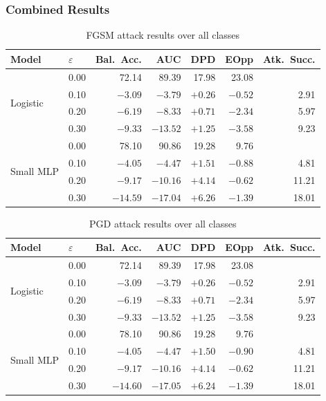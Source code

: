 \documentclass[11pt]{article}
\begin{document}
\subsubsection*{Combined Results}

\begin{table}[H]
\centering
\caption{FGSM attack results over all classes}
\label{tab:fgsm}
\begin{tabular}{llrrrrr}
\toprule
Model & $\varepsilon$ & Bal.\ Acc. & AUC & DPD & EOpp & Atk.\ Succ. \\
\midrule
\multirow{4}{*}{Logistic}
 & 0.00 & 72.14 & 89.39 & 17.98 & 23.08 & \\
 & 0.10 & $-3.09$ & $-3.79$ & $+0.26$ & $-0.52$ & 2.91 \\
 & 0.20 & $-6.19$ & $-8.33$ & $+0.71$ & $-2.34$ & 5.97 \\
 & 0.30 & $-9.33$ & $-13.52$ & $+1.25$ & $-3.58$ & 9.23 \\
\midrule
\multirow{4}{*}{Small MLP}
 & 0.00 & 78.10 & 90.86 & 19.28 & 9.76 & \\
 & 0.10 & $-4.05$ & $-4.47$ & $+1.51$ & $-0.88$ & 4.81 \\
 & 0.20 & $-9.17$ & $-10.16$ & $+4.14$ & $-0.62$ & 11.21 \\
 & 0.30 & $-14.59$ & $-17.04$ & $+6.26$ & $-1.39$ & 18.01 \\
\bottomrule
\end{tabular}
\end{table}

\begin{table}[H]
\centering
\caption{PGD attack results over all classes}
\label{tab:pgd}
\begin{tabular}{llrrrrr}
\toprule
Model & $\varepsilon$ & Bal.\ Acc. & AUC & DPD & EOpp & Atk.\ Succ. \\
\midrule
\multirow{4}{*}{Logistic}
 & 0.00 & 72.14 & 89.39 & 17.98 & 23.08 & \\
 & 0.10 & $-3.09$ & $-3.79$ & $+0.26$ & $-0.52$ & 2.91 \\
 & 0.20 & $-6.19$ & $-8.33$ & $+0.71$ & $-2.34$ & 5.97 \\
 & 0.30 & $-9.33$ & $-13.52$ & $+1.25$ & $-3.58$ & 9.23 \\
\midrule
\multirow{4}{*}{Small MLP}
 & 0.00 & 78.10 & 90.86 & 19.28 & 9.76 & \\
 & 0.10 & $-4.05$ & $-4.47$ & $+1.50$ & $-0.90$ & 4.81 \\
 & 0.20 & $-9.17$ & $-10.16$ & $+4.14$ & $-0.62$ & 11.21 \\
 & 0.30 & $-14.60$ & $-17.05$ & $+6.24$ & $-1.39$ & 18.01 \\
\bottomrule
\end{tabular}
\end{table}
\end{document}
